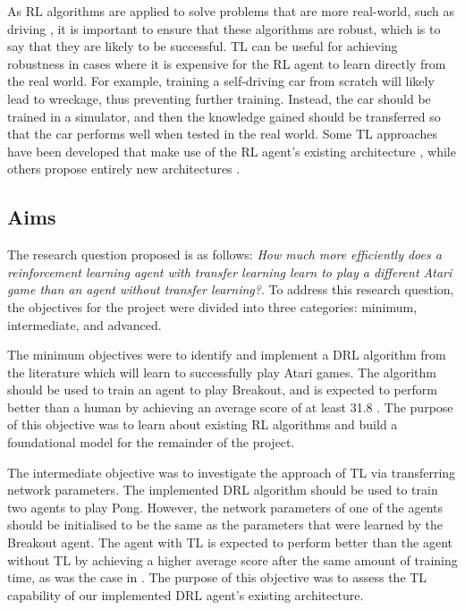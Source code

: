 \documentclass[12pt,a4paper]{article}
\begin{document}
As RL algorithms are applied to solve problems that are more real-world, such as driving \cite{DBLP:journals/corr/YouPWL17}, it is important to ensure that these algorithms are robust, which is to say that they are likely to be successful. TL can be useful for achieving robustness in cases where it is expensive for the RL agent to learn directly from the real world. For example, training a self-driving car from scratch will likely lead to wreckage, thus preventing further training. Instead, the car should be trained in a simulator, and then the knowledge gained should be transferred so that the car performs well when tested in the real world. Some TL approaches have been developed that make use of the RL agent's existing architecture \cite{parisotto2016actormimic}, while others propose entirely new architectures \cite{DBLP:journals/corr/RusuRDSKKPH16}.

\subsection{Aims}
The research question proposed is as follows: \textit{How much more efficiently does a reinforcement learning agent with transfer learning learn to play a different Atari game than an agent without transfer learning?}. To address this research question, the objectives for the project were divided into three categories: minimum, intermediate, and advanced. 

The minimum objectives were to identify and implement a DRL algorithm from the literature which will learn to successfully play Atari games. The algorithm should be used to train an agent to play Breakout, and is expected to perform better than a human by achieving an average score of at least 31.8 \cite{Mnih2015}. The purpose of this objective was to learn about existing RL algorithms and build a foundational model for the remainder of the project.

The intermediate objective was to investigate the approach of TL via transferring network parameters. The implemented DRL algorithm should be used to train two agents to play Pong. However, the network parameters of one of the agents should be initialised to be the same as the parameters that were learned by the Breakout agent. The agent with TL is expected to perform better than the agent without TL by achieving a higher average score after the same amount of training time, as was the case in \cite{parisotto2016actormimic}. The purpose of this objective was to assess the TL capability of our implemented DRL agent's existing architecture. 
\end{document}
